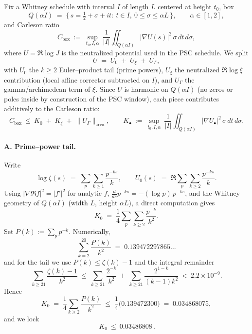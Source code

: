 \documentclass[11pt]{article}
\theoremstyle{definition}
\theoremstyle{remark}
\begin{document}
Fix a Whitney schedule with interval $I$ of length $L$ centered at height $t_0$, box
\[
Q(\alpha I)\;=\;\{\,s=\tfrac12+\sigma+it:\ t\in I,\ 0\le \sigma\le \alpha L\,\},
\qquad \alpha\in[1,2],
\]
and Carleson ratio
\[
C_{\mathrm{box}}\ :=\ \sup_{t_0,I,\alpha}\ \frac{1}{|I|}\iint_{Q(\alpha I)} |\nabla U(s)|^2\,\sigma\,dt\,d\sigma,
\]
where $U=\Re\log J$ is the neutralized potential used in the PSC schedule. We split
\[
U\;=\;U_0\;+\;U_\xi\;+\;U_\Gamma,
\]
with $U_0$ the $k\ge2$ Euler–product tail (prime powers), $U_\xi$ the neutralized $\Re\log\xi$ contribution (local affine corrector subtracted on $I$), and $U_\Gamma$ the gamma/archimedean term of $\xi$. Since $U$ is harmonic on $Q(\alpha I)$ (no zeros or poles inside by construction of the PSC window), each piece contributes additively to the Carleson ratio:
\[
C_{\mathrm{box}}\ \le\ K_0\;+\;K_\xi\;+\;\|U_\Gamma\|_{\mathrm{area}},
\qquad
K_\bullet\ :=\ \sup_{t_0,I,\alpha}\ \frac{1}{|I|}\iint_{Q(\alpha I)} |\nabla U_\bullet|^2\,\sigma\,dt\,d\sigma.
\]

\paragraph{A. Prime–power tail.}
Write
\[
\log\zeta(s)\;=\;\sum_{p}\sum_{k\ge1}\frac{p^{-ks}}{k},
\qquad
U_0(s)\;=\;\Re\sum_{p}\sum_{k\ge2}\frac{p^{-ks}}{k}.
\]
Using $|\nabla\Re f|^2=|f'|^2$ for analytic $f$, $\frac{d}{ds}p^{-ks}=-(\log p)\,p^{-ks}$, and the Whitney geometry of $Q(\alpha I)$ (width $L$, height $\alpha L$), a direct computation gives
\[
K_0\;=\;\frac14\sum_{p}\sum_{k\ge2}\frac{p^{-k}}{k^2}.
\]
Set $P(k):=\sum_{p}p^{-k}$. Numerically,
\[
\sum_{k=2}^{20}\frac{P(k)}{k^2}\;=\;0.139472297865\ldots
\]
and for the tail we use $P(k)\le \zeta(k)-1$ and the integral remainder
\[
\sum_{k\ge21}\frac{\zeta(k)-1}{k^2}\ \le\ \sum_{k\ge21}\frac{2^{-k}}{k^2}\ +\ \sum_{k\ge21}\frac{2^{1-k}}{(k-1)k^2}\ <\ 2.2\times10^{-9}.
\]
Hence
\[
K_0\;=\;\frac14\sum_{k\ge2}\frac{P(k)}{k^2}
\;\le\;
\frac14\Big(0.139472300\Big)
\;=\;0.034868075,
\]
and we lock
\[
\boxed{\,K_0\ \le\ 0.03486808\,}.
\]
\end{document}
